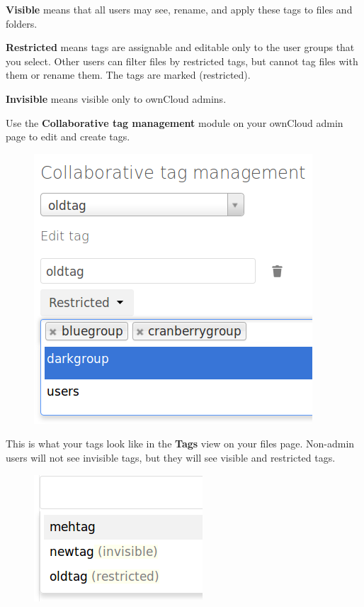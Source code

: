 \documentclass[letterpaper,10pt,english]{sphinxmanual}
\begin{document}
\textbf{Visible} means that all users may see, rename, and apply these tags to files and folders.

\textbf{Restricted} means tags are assignable and editable only to the user groups that you select. Other users can filter files by restricted tags, but cannot tag files with them or rename them. The tags are marked (restricted).

\textbf{Invisible} means visible only to ownCloud admins.

Use the \textbf{Collaborative tag management} module on your ownCloud admin page to edit and create tags.
\begin{figure}[htbp]
\centering

\includegraphics{workflow-1.png}
\end{figure}

This is what your tags look like in the \textbf{Tags} view on your files page. Non-admin users will not see invisible tags, but they will see visible and restricted tags.
\begin{figure}[htbp]
\centering

\includegraphics{workflow-5.png}
\end{figure}
\end{document}
